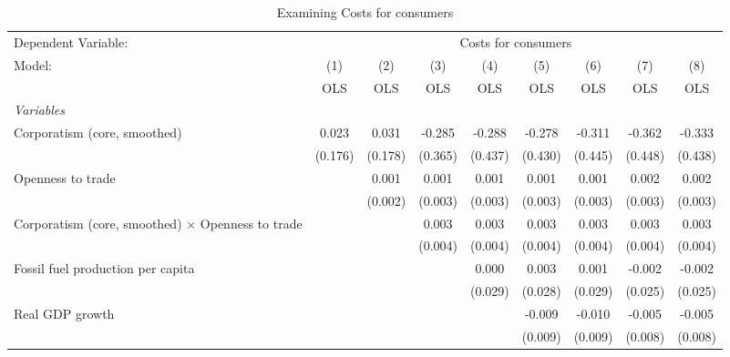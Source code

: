 
\begin{table}[htbp]
   \caption{Examining Costs for consumers}
   \centering
   \begin{tabular}{lcccccccc}
      \toprule
      Dependent Variable: & \multicolumn{8}{c}{Costs for consumers}\\
      Model:                                                   & (1)     & (2)     & (3)     & (4)     & (5)     & (6)     & (7)     & (8)\\  
                                                               &  OLS    & OLS     & OLS     & OLS     & OLS     & OLS     & OLS     & OLS\\  
      \midrule
      \emph{Variables}\\
      Corporatism (core, smoothed)                             & 0.023   & 0.031   & -0.285  & -0.288  & -0.278  & -0.311  & -0.362  & -0.333\\   
                                                               & (0.176) & (0.178) & (0.365) & (0.437) & (0.430) & (0.445) & (0.448) & (0.438)\\   
      Openness to trade                                        &         & 0.001   & 0.001   & 0.001   & 0.001   & 0.001   & 0.002   & 0.002\\   
                                                               &         & (0.002) & (0.003) & (0.003) & (0.003) & (0.003) & (0.003) & (0.003)\\   
      Corporatism (core, smoothed) $\times$ Openness to trade  &         &         & 0.003   & 0.003   & 0.003   & 0.003   & 0.003   & 0.003\\   
                                                               &         &         & (0.004) & (0.004) & (0.004) & (0.004) & (0.004) & (0.004)\\   
      Fossil fuel production per capita                        &         &         &         & 0.000   & 0.003   & 0.001   & -0.002  & -0.002\\   
                                                               &         &         &         & (0.029) & (0.028) & (0.029) & (0.025) & (0.025)\\   
      Real GDP growth                                          &         &         &         &         & -0.009  & -0.010  & -0.005  & -0.005\\   
                                                               &         &         &         &         & (0.009) & (0.009) & (0.008) & (0.008)\\   

\end{tabular}
\end{table}
